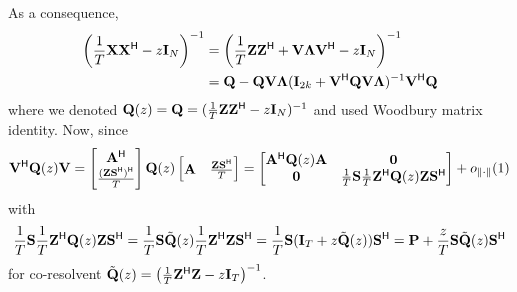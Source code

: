 \documentclass[11pt,a4paper]{article}
\begin{document}
As a consequence, 
\begin{align*}
	\left(\frac1T \X \X^\H - z \I_N \right)^{-1} &= \left(\frac1T \Z \Z^\H + \V \bLambda \V^\H - z \I_N \right)^{-1} \\ 
	&= \Q - \Q \V \bLambda (\I_{2k} + \V^\H \Q \V \bLambda)^{-1} \V^\H \Q
\end{align*}
where we denoted $\Q(z) = \Q = (\frac1T \Z \Z^\H - z \I_N)^{-1}$ and used Woodbury matrix identity. Now, since
\begin{equation}
	\V^\H \Q(z) \V = \begin{bmatrix}\A^\H \\ \frac{(\Z \S^\H)^\H}{T}\end{bmatrix} \Q(z) \begin{bmatrix} \A & \frac{\Z \S^\H}{T}\end{bmatrix} = \begin{bmatrix} \A^\H \Q(z) \A & \mathbf{0} \\ \mathbf{0} & \frac1T \S \frac1T \Z^\H \Q(z) \Z \S^\H \end{bmatrix} + o_{\| \cdot \|}(1)
\end{equation}
with
\begin{equation}
	\frac1T \S \frac1T \Z^\H \Q(z) \Z \S^\H = \frac1T \S \tilde \Q(z) \frac1T \Z^\H \Z \S^\H = \frac1T \S (\I_T + z \tilde \Q(z)) \S^\H = \mathbf{P} + \frac{z}T \S \tilde \Q(z) \S^\H
\end{equation}
for co-resolvent $\tilde \Q(z) = \left( \frac1T \Z^\H \Z - z \I_T \right)^{-1}$.
\end{document}
